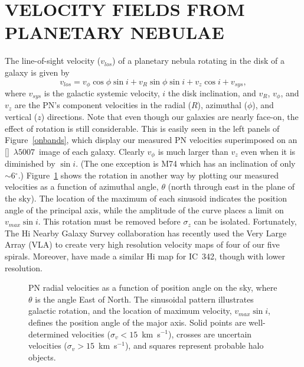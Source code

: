 \documentclass[12pt,preprint]{emulateapj}
\newcommand{\kms}{km~s$^{-1}$}
\newcommand{\Oline}{[\ion{O}{3}]~$\lambda 5007$}
\begin{document}
\section{VELOCITY FIELDS FROM PLANETARY NEBULAE}
The line-of-sight velocity ($v_{los}$) of a planetary nebula rotating in the disk of a galaxy is given by
\begin{equation}
v_{los} = v_{\phi} \cos \phi \sin i + v_R \sin \phi \sin i + v_z \cos i + v_{sys},
\label{vlos_eq}
\end{equation}
where $v_{sys}$ is the galactic systemic velocity, $i$ the disk inclination, and $v_R$, $v_{\phi}$, and $v_z$ are the PN's component velocities in the radial ($R$), azimuthal ($\phi$), and vertical ($z$) directions.  Note that even though our galaxies are nearly face-on, the effect of rotation is still considerable.  This is easily seen in the left panels of Figure~\ref{onbands}, which display our measured PN velocities superimposed on an \Oline\ image of each galaxy.  Clearly $v_{\phi}$ is much larger than $v_z$ even when it is diminished by $\sin i$.  (The one exception is M74 which has an inclination of only $\sim$6$^\circ$.)  Figure~\ref{v5007theta} shows the rotation in another way by plotting our measured velocities as a function of azimuthal angle, $\theta$ (north through east in the plane of the sky).  The location of the maximum of each sinusoid indicates the position angle of the principal axis, while the amplitude of the curve places a limit on $v_{max} \sin i$.  This rotation must be removed before $\sigma_z$ can be isolated.  Fortunately, The H{\sc i} Nearby Galaxy Survey \citep[THINGS;][]{THINGS} collaboration has recently used the Very Large Array (VLA) to create very high resolution velocity maps of four of our five spirals.  Moreover, \citet{IC_HI} have made a similar H{\sc i} map for IC~342, though with lower resolution.

\begin{figure}[b]
\caption{\scriptsize PN radial velocities as a function of position angle on the sky, where $\theta$ is the angle East of North.   The sinusoidal pattern illustrates galactic rotation, and the location of maximum velocity, $v_{max} \sin i$, defines the position angle of the major axis.  Solid points are well-determined velocities ($\sigma_v < 15$~\kms), crosses are uncertain velocities ($\sigma_v > 15$~\kms), and squares represent probable halo objects. \label{v5007theta} }
\end{figure}
\end{document}
